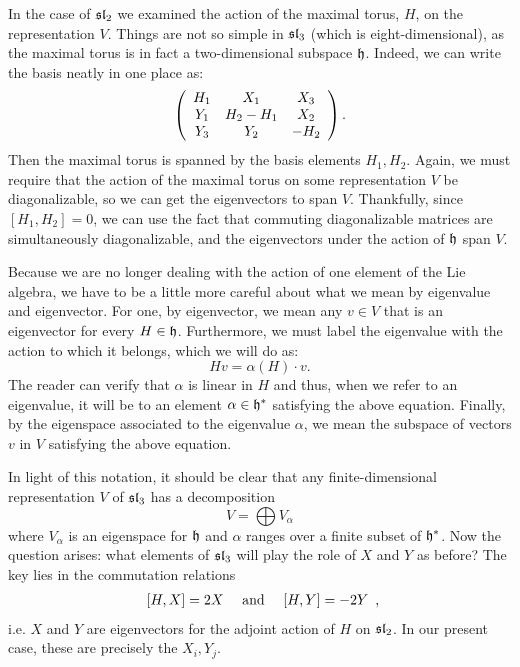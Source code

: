 \documentclass{../mathnotes}
\begin{document}
In the case of $\mathfrak{sl}_2$ we examined the action of the maximal torus, $H$, on the representation $V$. Things
are not so simple in $\mathfrak{sl}_3$ (which is eight-dimensional), as the maximal torus is in fact a two-dimensional
subspace $\mathfrak h$. Indeed, we can write the basis neatly in one place as:
\begin{equation*}
    \left( 
    \begin{array}[]{ccc}
        H_1 & X_1 & X_3\\
        Y_1 & H_2-H_1 & X_2\\
        Y_3 & Y_2 & -H_2
    \end{array}
    \right).
\end{equation*}
Then the maximal torus is spanned by the basis elements ${H_1,H_2}$. Again, we must require that the action
of the maximal torus on some representation $V$ be diagonalizable, so we can get the eigenvectors to span $V$.
Thankfully, since $[H_1,H_2]=0$, we can use the fact that commuting diagonalizable matrices are simultaneously
diagonalizable, and the eigenvectors under the action of $\mathfrak h$ span $V$.

Because we are no longer dealing with the action of one element of the Lie algebra, we have to be a little more
careful about what we mean by eigenvalue and eigenvector. For one, by eigenvector, we mean any $v\in V$ that is an eigenvector
for every $H\in\mathfrak h$. Furthermore, we must label the eigenvalue with the action to which it belongs, which we will do as:
\[Hv=\alpha(H)\cdot v.\]
The reader can verify that $\alpha$ is linear in $H$ and thus, when we refer to an eigenvalue, it will be to an element $\alpha\in\mathfrak h^*$
satisfying the above equation. Finally, by the eigenspace associated to the eigenvalue $\alpha$, we mean the subspace of
vectors $v$ in $V$ satisfying the above equation.

In light of this notation, it should be clear that any finite-dimensional representation $V$ of $\mathfrak{sl}_3$ has a decomposition
\[V=\bigoplus V_\alpha\]
where $V_\alpha$ is an eigenspace for $\mathfrak h$ and $\alpha$ ranges over a finite subset of $\mathfrak h^*$. Now the question arises:
what elements of $\mathfrak{sl}_3$ will play the role of $X$ and $Y$ as before? The key lies in the commutation relations
\[
    \begin{array}[]{ccc}
        [H,X]=2X & \text{ and } & [H,Y]=-2Y 
    \end{array},
\]
i.e. $X$ and $Y$ are eigenvectors for the adjoint action of $H$ on $\mathfrak{sl}_2$. In our present case, these are precisely
the $X_i,Y_j$.
\end{document}

